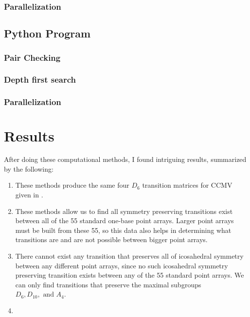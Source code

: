 \documentclass[a4paper,10pt]{article}
\theoremstyle{plain}
\theoremstyle{definition}
\theoremstyle{remark}
\begin{document}
\subsubsection{Parallelization}

\subsection{Python Program}
\subsubsection{Pair Checking}
\subsubsection{Depth first search}
\subsubsection{Parallelization}

\section{Results}
After doing these computational methods, I found intriguing results, summarized by the following:
\begin{enumerate}
	\item These methods produce the same four \( D_6 \) transition matrices for CCMV given in \cite{indelicatoetal2012}.
	
	\item These methods allow us to find all symmetry preserving transitions exist between all of the 55 standard one-base point arrays. Larger point arrays must be built from these 55, so this data also helps in determining what transitions are and are not possible between bigger point arrays.
	
	\item There cannot exist any transition that preserves all of icosahedral symmetry between any different point arrays, since no such icosahedral symmetry preserving transition exists between any of the 55 standard point arrays.
		We can only find transitions that preserve the maximal subgroups \(D_6, D_{10}, \text{ and } A_4\).
	
	\item {}
\end{enumerate}
\end{document}
